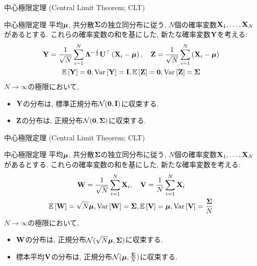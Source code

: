 \documentclass[dvipdfmx,notheorems,t]{beamer}
\begin{document}
\begin{frame}{中心極限定理 (Central Limit Theorem; CLT)}
\begin{block}{中心極限定理}
  平均$\vb*{\mu}$, 共分散$\vb{\Sigma}$の独立同分布に従う, $N$個の確率変数$\vb{X}_1, \ldots, \vb{X}_N$があるとする.
  これらの確率変数の和を基にした, 新たな確率変数$\vb{Y}$を考える:
  \begin{gather*}
    \vb{Y} = \frac{1}{\sqrt{N}} \sum_{i = 1}^N \vb{\Lambda}^{-\frac{1}{2}} \vb{U}^\top
      \left( \vb{X}_i - \vb*{\mu} \right), \quad
    \vb{Z} = \frac{1}{\sqrt{N}} \sum_{i = 1}^N \left( \vb{X}_i - \vb*{\mu} \right) \\
    \operatorname{\mathbb{E}} \left[ \vb{Y} \right] = \vb{0}, \operatorname{Var} \left[ \vb{Y} \right] = \vb{I},
    \operatorname{\mathbb{E}} \left[ \vb{Z} \right] = \vb{0}, \operatorname{Var} \left[ \vb{Z} \right] = \vb{\Sigma}
  \end{gather*}
  $N \to \infty$の極限において,
  \begin{itemize}
    \item $\vb{Y}$の分布は, 標準正規分布$\mathcal{N}(\vb{0}, \vb{I})$に収束する.
    \item $\vb{Z}$の分布は, 正規分布$\mathcal{N}(\vb{0}, \vb{\Sigma})$に収束する.
  \end{itemize}
\end{block}
\end{frame}

\begin{frame}{中心極限定理 (Central Limit Theorem; CLT)}
\begin{block}{中心極限定理}
  平均$\vb*{\mu}$, 共分散$\vb{\Sigma}$の独立同分布に従う, $N$個の確率変数$\vb{X}_1, \ldots, \vb{X}_N$があるとする.
  これらの確率変数の和を基にした, 新たな確率変数を考える:
  \begin{gather*}
    \vb{W} = \frac{1}{\sqrt{N}} \sum_{i = 1}^N \vb{X}_i, \quad
    \vb{V} = \frac{1}{N} \sum_{i = 1}^N \vb{X}_i \\
    \operatorname{\mathbb{E}} \left[ \vb{W} \right] = \sqrt{N} \vb*{\mu}, \operatorname{Var} \left[ \vb{W} \right] = \vb{\Sigma},
    \operatorname{\mathbb{E}} \left[ \vb{V} \right] = \vb*{\mu}, \operatorname{Var} \left[ \vb{V} \right] = \frac{\vb{\Sigma}}{N}
  \end{gather*}
  $N \to \infty$の極限において,
  \begin{itemize}
    \item $\vb{W}$の分布は, 正規分布$\mathcal{N}(\sqrt{N} \vb*{\mu}, \vb{\Sigma})$に収束する.
    \item 標本平均$\vb{V}$の分布は, 正規分布$\mathcal{N}(\vb*{\mu}, \frac{\vb{\Sigma}}{N})$に収束する.
  \end{itemize}
\end{block}
\end{frame}
\end{document}
